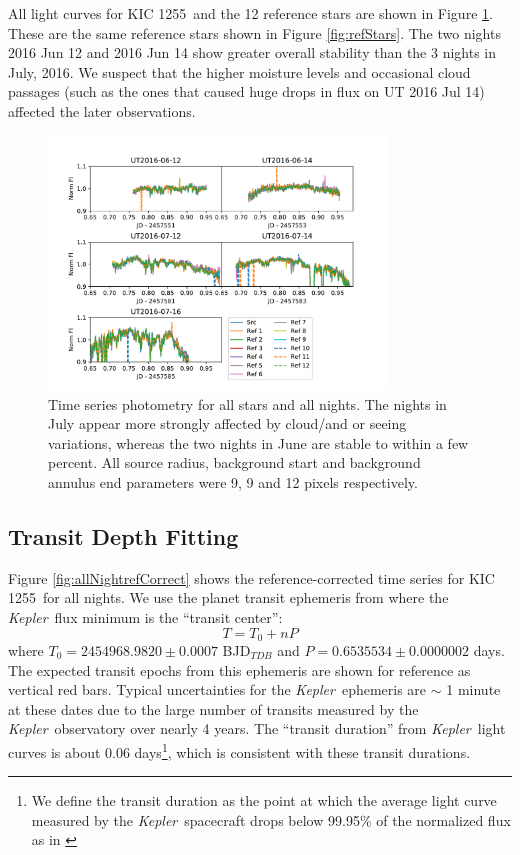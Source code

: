 \documentclass[preprint,trackchanges]{aastex61}
\newcommand{\shStar}{KIC 1255}
\newcommand{\kepler}{{\it Kepler}}
\begin{document}
All light curves for \shStar\ and the 12 reference stars are shown in Figure \ref{fig:allNightallStar}.
These are the same reference stars shown in Figure \ref{fig:refStars}.
The two nights 2016 Jun 12 and 2016 Jun 14 show greater overall stability than the 3 nights in July, 2016.
We suspect that the higher moisture levels and occasional cloud passages (such as the ones that caused huge drops in flux on UT 2016 Jul 14) affected the later observations.

\begin{figure}
\begin{centering}
\includegraphics[width=0.8\textwidth]{all_kic1255_allstar.pdf}
\caption{Time series photometry for all stars and all nights.
The nights in July appear more strongly affected by cloud/and or seeing variations, whereas the two nights in June are stable to within a few percent.
All source radius, background start and background annulus end parameters were 9, 9 and 12 pixels respectively.}\label{fig:allNightallStar}
\end{centering}
\end{figure}

\subsection{Transit Depth Fitting}\label{sec:transFitting}

Figure \ref{fig:allNightrefCorrect} shows the reference-corrected time series for \shStar\ for all nights.
We use the planet transit ephemeris from \citet{croll2015starspots} where the \kepler\ flux minimum is the ``transit center'':
\begin{equation}\label{eq:ephem}
T = T_0 + n P
\end{equation}
where $T_0 = 2 454 968.982 0 \pm 0.000 7$ BJD$_{TDB}$ and $P = 0.653 553 4 \pm 0.000 000 2$ days.
The expected transit epochs from this ephemeris are shown for reference as vertical red bars.
Typical uncertainties for the \kepler\ ephemeris are $\sim$ 1 minute at these dates due to the large number of transits measured by the \kepler\ observatory over nearly 4 years.
The ``transit duration'' from \kepler\ light curves is about 0.06 days\footnote{We define the transit duration as the point at which the average light curve measured by the \kepler\ spacecraft drops below 99.95\% of the normalized flux as in \citet{schlawin2016kic1255}}, which is consistent with these transit durations.
\end{document}
